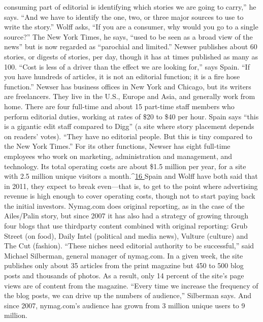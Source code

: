 consuming part of editorial is identifying which stories we are going to carry,''
he says. ``And we have to identify the one, two, or three major sources to use to
write the story.'' Wolff asks, ``If you are a consumer, why would you go to a single
source?'' The New York Times, he says, ``used to be seen as a broad view of the
news'' but is now regarded as ``parochial and limited.'' Newser publishes about 60
stories, or digests of stories, per day, though it has at times published as many as
100. ``Cost is less of a driver than the effect we are looking for,'' says Spain. ``If you
have hundreds of articles, it is not an editorial function; it is a fire hose function.''
Newser has business offices in New York and Chicago, but its writers are freelancers.
They live in the U.S., Europe and Asia, and generally work from home.
There are four full-time and about 15 part-time staff members who perform
editorial duties, working at rates of \$20 to \$40 per hour. Spain says ``this is a
gigantic edit staff compared to Digg'' (a site where story placement depends on
readers’ votes). ``They have no editorial people. But this is tiny compared to the
New York Times.''
For its other functions, Newser has eight full-time employees who work on
marketing, administration and management, and technology. Its total operating
costs are about \$1.5 million per year, for a site with 2.5 million unique visitors
a month.^{\href{#endnotes-ch6}{16 }}Spain and Wolff have both said that in 2011, they expect to break
even—that is, to get to the point where advertising revenue is high enough to
cover operating costs, though not to start paying back the initial investors.
Nymag.com does original reporting, as in the case of the Ailes/Palin story, but
since 2007 it has also had a strategy of growing through four blogs that use thirdparty
content combined with original reporting: Grub Street (on food), Daily
Intel (political and media news), Vulture (culture) and The Cut (fashion). ``These
niches need editorial authority to be successful,'' said Michael Silberman, general
manager of nymag.com. In a given week, the site publishes only about 35 articles
from the print magazine but 450 to 500 blog posts and thousands of photos. As a
result, only 14 percent of the site’s page views are of content from the magazine.
``Every time we increase the frequency of the blog posts, we can drive up the
numbers of audience,'' Silberman says. And since 2007, nymag.com’s audience
has grown from 3 million unique users to 9 million.

